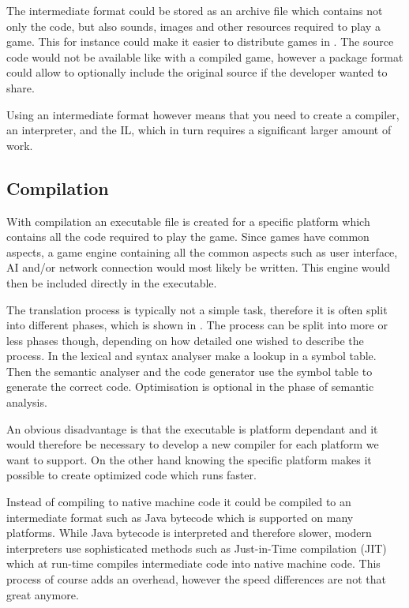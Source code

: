 The intermediate format could be stored as an archive file which contains not
only the code, but also sounds, images and other resources required to play a game. 
This for instance could make it easier to distribute games in \productname{}. The
source code would not be available like with a compiled game, however a package
format could allow to optionally include the original source if the developer
wanted to share.

Using an intermediate format however means that you need to create a compiler,
an interpreter, and the IL, which in turn requires a significant larger amount of work.

\subsection{Compilation}
\label{sec:compilation}
With compilation an executable file is created for a specific platform which
contains all the code required to play the game. Since games have common
aspects, a game engine containing all the common aspects such as user interface,
AI and/or network connection would most likely be written. This engine would
then be included directly in the executable.

The translation process is typically not a simple task, therefore it is often
split into different phases, which is shown in .
The process can be split into more or less phases though, depending on how
detailed one wished to describe the process. In 
the lexical and syntax analyser make a lookup in a symbol table. Then the
semantic analyser and the code generator use the symbol table to generate the
correct code. Optimisation is optional in the phase of semantic analysis.
\cite[p. 46]{sebesta2013}



An obvious disadvantage is that the executable is platform dependant and it
would therefore be necessary to develop a new compiler for each platform we want
to support. On the other hand knowing the specific platform makes it possible to
create optimized code which runs faster.

Instead of compiling to native machine code it could be compiled to an
intermediate format such as Java bytecode which is supported on many platforms.
While Java bytecode is interpreted and therefore slower, modern interpreters
use sophisticated methods such as Just-in-Time compilation (JIT) which at
run-time compiles intermediate code into native machine code. This process of
course adds an overhead, however the speed differences are not that great
anymore.
\cite{java-speed}

